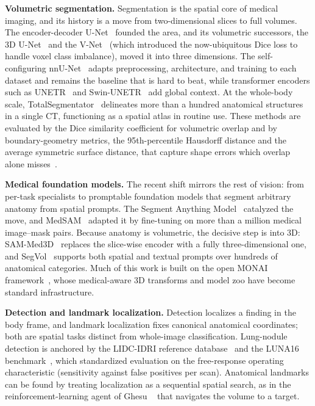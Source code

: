 \textbf{Volumetric segmentation.} Segmentation is the spatial core of medical imaging, and its history is a move from two-dimensional slices to full volumes. 
The encoder-decoder U-Net~\cite{ronneberger2015unet} founded the area, and its volumetric successors, the 3D U-Net~\cite{cciccek20163d} and the V-Net~\cite{milletari2016vnet} (which introduced the now-ubiquitous Dice loss to handle voxel class imbalance), moved it into three dimensions. 
The self-configuring nnU-Net~\cite{isensee2021nnunet} adapts preprocessing, architecture, and training to each dataset and remains the baseline that is hard to beat, while transformer encoders such as UNETR~\cite{hatamizadeh2022unetr} and Swin-UNETR~\cite{hatamizadeh2022swinunetr} add global context. 
At the whole-body scale, TotalSegmentator~\cite{wasserthal2023totalsegmentator} delineates more than a hundred anatomical structures in a single CT, functioning as a spatial atlas in routine use. 
These methods are evaluated by the Dice similarity coefficient for volumetric overlap and by boundary-geometry metrics, the 95th-percentile Hausdorff distance and the average symmetric surface distance, that capture shape errors which overlap alone misses~\cite{taha2015metrics}.

\textbf{Medical foundation models.} The recent shift mirrors the rest of vision: from per-task specialists to promptable foundation models that segment arbitrary anatomy from spatial prompts. 
The Segment Anything Model~\cite{kirillov2023sam} catalyzed the move, and MedSAM~\cite{ma2024medsam} adapted it by fine-tuning on more than a million medical image--mask pairs. 
Because anatomy is volumetric, the decisive step is into 3D: SAM-Med3D~\cite{wang2023sammed3d} replaces the slice-wise encoder with a fully three-dimensional one, and SegVol~\cite{du2024segvol} supports both spatial and textual prompts over hundreds of anatomical categories. 
Much of this work is built on the open MONAI framework~\cite{cardoso2022monai}, whose medical-aware 3D transforms and model zoo have become standard infrastructure.

\textbf{Detection and landmark localization.} Detection localizes a finding in the body frame, and landmark localization fixes canonical anatomical coordinates; both are spatial tasks distinct from whole-image classification. 
Lung-nodule detection is anchored by the LIDC-IDRI reference database~\cite{armato2011lidcidri} and the LUNA16 benchmark~\cite{setio2017luna16}, which standardized evaluation on the free-response operating characteristic (sensitivity against false positives per scan). 
Anatomical landmarks can be found by treating localization as a sequential spatial search, as in the reinforcement-learning agent of Ghesu \etal~\cite{ghesu2016landmark} that navigates the volume to a target.


